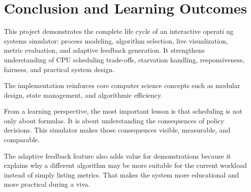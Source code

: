 \documentclass[12pt]{article}
\begin{document}
\section{Conclusion and Learning Outcomes}
This project demonstrates the complete life cycle of an interactive operati
ng systems simulator: process modeling, algorithm selection, live visualization, metric evaluation, and adaptive feedback generation. It strengthens understanding of CPU scheduling trade-offs, starvation handling, responsiveness, fairness, and practical system design.

The implementation reinforces core computer science concepts such as modular design, state management, and algorithmic efficiency.

From a learning perspective, the most important lesson is that scheduling is not only about formulas. It is about understanding the consequences of policy decisions. This simulator makes those consequences visible, measurable, and comparable.

The adaptive feedback feature also adds value for demonstrations because it explains why a different algorithm may be more suitable for the current workload instead of simply listing metrics. That makes the system more educational and more practical during a viva.
\end{document}
